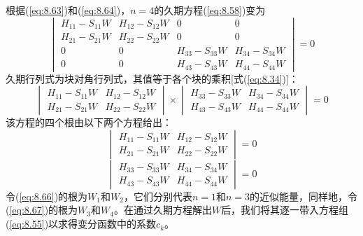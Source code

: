 \begin{examplebox}
        根据(\ref{eq:8.63})和(\ref{eq:8.64})，$n=4$的久期方程(\ref{eq:8.58})变为
        \begin{equation}
            \begin{vmatrix}
                H_{11} - S_{11}W & H_{12} - S_{12}W & 0 & 0 \\
                H_{21} - S_{21}W & H_{22} - S_{22}W & 0 & 0 \\
                0 & 0 & H_{33} - S_{33}W & H_{34} - S_{34}W \\
                0 & 0 & H_{43} - S_{43}W & H_{44} - S_{44}W
            \end{vmatrix} = 0
            \label{eq:8.65}
        \end{equation}
        久期行列式为块对角行列式，其值等于各个块的乘积[式(\ref{eq:8.34})]：
        \begin{equation*}
            \begin{vmatrix}
                H_{11} - S_{11}W & H_{12} - S_{12}W \\
                H_{21} - S_{21}W & H_{22} - S_{22}W
            \end{vmatrix} \times \begin{vmatrix}
                H_{33} - S_{33}W & H_{34} - S_{34}W \\
                H_{43} - S_{43}W & H_{44} - S_{44}W
            \end{vmatrix} = 0
        \end{equation*}
        该方程的四个根由以下两个方程给出：
        \begin{equation}
            \begin{vmatrix}
                H_{11} - S_{11}W & H_{12} - S_{12}W \\
                H_{21} - S_{21}W & H_{22} - S_{22}W
            \end{vmatrix} = 0
            \label{eq:8.66}
        \end{equation}
        \begin{equation}
            \begin{vmatrix}
                H_{33} - S_{33}W & H_{34} - S_{34}W \\
                H_{43} - S_{43}W & H_{44} - S_{44}W
            \end{vmatrix} = 0
            \label{eq:8.67}
        \end{equation}
        令(\ref{eq:8.66})的根为$W_1$和$W_2$，它们分别代表$n=1$和$n=3$的近似能量，同样地，令(\ref{eq:8.67})的根为$W_3$和$W_4$。在通过久期方程解出$W$后，我们将其逐一带入方程组(\ref{eq:8.55})以求得变分函数中的系数$c_k$。

\end{examplebox}
